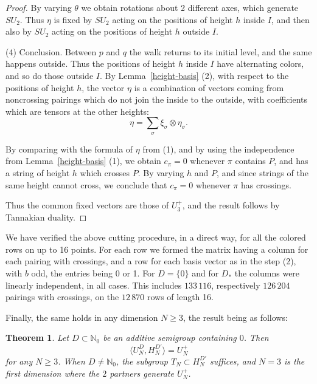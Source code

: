 \documentclass[11pt,a4paper]{article}
\newtheorem{thm}{Theorem}[section]
\begin{document}
\begin{proof}
By varying $\theta$ we obtain rotations about 2 different axes, which generate $SU_2$. Thus $\eta$ is fixed by $SU_2$ acting on the positions of height $h$ inside $I$, and then also by $SU_2$ acting on the positions of height $h$ outside $I$.

(4) Conclusion. Between $p$ and $q$ the walk returns to its initial level, and the same happens outside. Thus the positions of height $h$ inside $I$ have alternating colors, and so do those outside $I$. By Lemma~\ref{height-basis} (2), with respect to the positions of height $h$, the vector $\eta$ is a combination of vectors coming from noncrossing pairings which do not join the inside to the outside, with coefficients which are tensors at the other heights:
\[
 \eta=\sum_\sigma\xi_\sigma\otimes\eta_\sigma.
\]

By comparing with the formula of $\eta$ from (1), and by using the independence from Lemma~\ref{height-basis} (1), we obtain $c_\pi=0$ whenever $\pi$ contains $P$, and has a string of height $h$ which crosses $P$. By varying $h$ and $P$, and since strings of the same height cannot cross, we conclude that $c_\pi=0$ whenever $\pi$ has crossings.

Thus the common fixed vectors are those of $U_3^+$, and the result follows by Tannakian duality.
\end{proof}

We have verified the above cutting procedure, in a direct way, for all the colored rows on up to 16 points. For each row we formed the matrix having a column for each pairing with crossings, and a row for each basis vector as in the step (2), with $b$ odd, the entries being 0 or 1. For $D=\{0\}$ and for $D_*$ the columns were linearly independent, in all cases. This includes $133\,116$, respectively $126\,204$ pairings with crossings, on the $12\,870$ rows of length 16.

Finally, the same holds in any dimension $N\geq3$, the result being as follows:

\begin{thm}\label{joint-generation}
Let $D\subset\mathbb N_0$ be an additive semigroup containing $0$. Then
\[
 \big\langle U_N^D,H_N^{D'}\big\rangle=U_N^+
\]
for any $N\geq3$. When $D\neq\mathbb N_0$, the subgroup $T_N\subset H_N^{D'}$ suffices, and $N=3$ is the first dimension where the $2$ partners generate $U_N^+$.
\end{thm}
\end{document}
